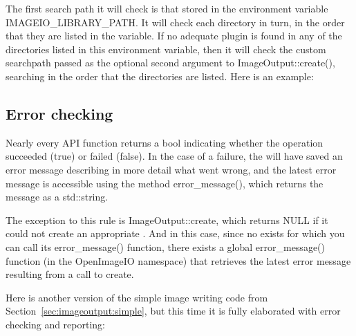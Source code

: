The first search path it will check is that stored in the environment
variable {\cf IMAGEIO_LIBRARY_PATH}.  It will check each directory in
turn, in the order that they are listed in the variable.  If no adequate
plugin is found in any of the directories listed in this environment
variable, then it will check the custom searchpath passed as the
optional second argument to {\cf ImageOutput::create()}, searching in
the order that the directories are listed.  Here is an example:



\subsection{Error checking}
\label{sec:imageoutput:errors}

Nearly every \ImageOutput API function returns a {\cf bool} indicating
whether the operation succeeded ({\cf true}) or failed ({\cf false}).
In the case of a failure, the \ImageOutput will have saved an error
message describing in more detail what went wrong, and the latest
error message is accessible using the \ImageOutput method 
{\cf error_message()}, which returns the message as a {\cf std::string}.

The exception to this rule is {\cf ImageOutput::create}, which returns
{\cf NULL} if it could not create an appropriate \ImageOutput.  And in
this case, since no \ImageOutput exists for which you can call its {\cf
  error_message()} function, there exists a global {\cf error_message()}
function (in the {\cf OpenImageIO} namespace) that retrieves the latest
error message resulting from a call to {\cf create}.

Here is another version of the simple image writing code from
Section~\ref{sec:imageoutput:simple}, but this time it is fully 
elaborated with error checking and reporting:

